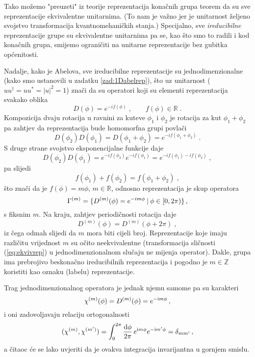 Tako možemo "preuzeti" iz teorije reprezentacija konačnih grupa
teorem da su sve reprezentacije ekvivalentne unitarnima. (To nam je važno
jer je unitarnost željeno svojstvo transformacija kvantnomehaničkih stanja.)
Specijalno, sve \emph{ireducibilne} reprezentacije grupe  su ekvivalentne unitarnima
pa se, kao što smo to radili i kod konačnih grupa, smijemo ograničiti na
unitarne reprezentacije bez gubitka općenitosti. 

Nadalje, kako je  Abelova, sve ireducibilne reprezentacije
su jednodimenzionalne (kako smo ustanovili u zadatku \ref{zad:1Dabelrep}),
što uz unitarnost ($uu^\dagger = uu^* = |u|^2=1$) znači da su operatori koji
su elementi reprezentacija svakako oblika
\begin{equation}
D(\phi)=e ^{-i f(\phi)} \;, \qquad f(\phi) \in \mathbb{R} \;.
\end{equation}
Kompozicija dvaju rotacija u ravnini za kuteve $\phi_1$ i $\phi_2$ je rotacija za
kut $\phi_1 + \phi_2$ pa zahtjev da reprezentacija bude
homomorfna grupi povlači
\begin{equation}
   D(\phi_2) D(\phi_1) = D(\phi_1+\phi_2) = e^{-i f(\phi_1 + \phi_2)}\;.
\end{equation}
S druge strane svojstvo eksponencijalne funkcije daje
\begin{equation}
   D(\phi_2) D(\phi_1) = e^{-i f(\phi_2)} e^{-i f(\phi_1)} =  e^{-i f(\phi_1) - i f(\phi_2)}\;,
\end{equation}
pa slijedi
\begin{equation}
   f(\phi_1)+f(\phi_2) = f(\phi_1+\phi_2) \;,
\end{equation}
što znači da je $f(\phi)=m\phi$, $m\in\mathbb{R}$, odnosno
reprezentacija je skup operatora
\begin{equation}
    \Gamma^{(m)} = \{ D^{(m)}(\phi) = e^{-i m \phi} \: | \:  \phi \in [0, 2\pi)\}\,,
\end{equation}
s fiksnim $m$.  Na kraju, zahtjev periodičnosti rotacija daje
\begin{equation}
D^{(m)}(\phi)=D^{(m)}(\phi + 2\pi) \;,
\end{equation}
iz čega odmah slijedi da $m$ mora biti cijeli broj.
Reprezentacije koje imaju različitu vrijednost $m$ su očito
neekvivalentne (transformacija sličnosti (\ref{eq:ekvivrep})
u jednodimenzionalnom slučaju ne mijenja operator).
Dakle, grupa  ima prebrojivo beskonačno ireducibilnih
reprezentacija i pogodno
je $m \in \mathbb{Z}$ koristiti kao oznaku (labelu) reprezentacije.

Trag jednodimenzionalnog operatora je jednak njemu samome pa su
karakteri 
\begin{equation}
\chi^{(m)}(\phi)=D^{(m)}(\phi)=e^{-\textrm{\scriptsize i} m \phi} \,,
\end{equation}
i oni zadovoljavaju relaciju ortogonalnosti
\begin{displaymath}
(\chi^{(m)}, \chi^{(m')})=\int_{0}^{2\pi}\frac{\textrm{d} \phi}{2\pi}\,
 e^{\textrm{\scriptsize i} m \phi}e^{-\textrm{\scriptsize i} m' \phi} = \delta_{mm'} \,,
\end{displaymath}
a čitaoc će se lako uvjeriti da je ovakva integracija invarijantna u gornjem smislu.

